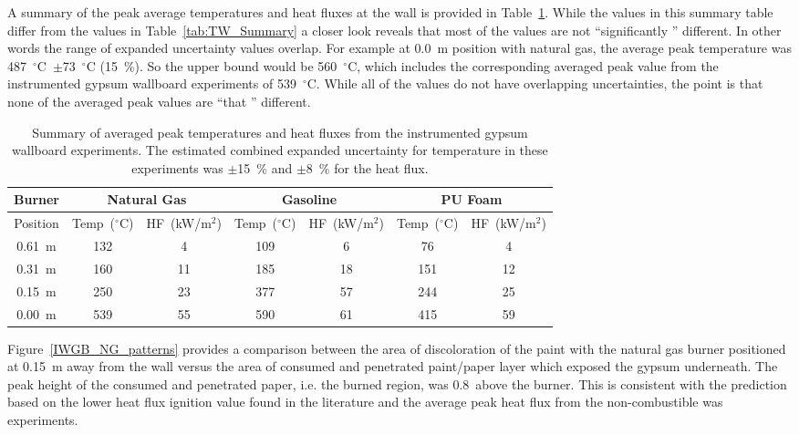 \documentclass[twoside]{uocthesis}
\begin{document}
A summary of the peak average temperatures and heat fluxes at the wall is provided in Table~\ref{tab:IWGB_Summary}. While the values in this summary table differ from the values in Table~\ref{tab:TW_Summary} a closer look reveals that most of the values are not ``significantly '' different.  In other words the range of expanded uncertainty values overlap.  For example at 0.0~m position with natural gas, the average peak temperature was 487~$^\circ$C~$\pm$73~$^\circ$C (15~\%). So the upper bound would be 560~$^\circ$C, which includes the corresponding averaged peak value from the instrumented gypsum wallboard experiments of 539~$^\circ$C.  While all of the values do not have overlapping uncertainties, the point is that none of the averaged peak values are ``that '' different.        

\begin{table}
	\centering
	\scriptsize
	\begin{tabular}{|c|c|c|c|c|c|c|}
		\hline {Burner} & \multicolumn{2}{c}{Natural Gas} & \multicolumn{2}{c}{Gasoline} & \multicolumn{2}{c|}{PU Foam} \\
		\hline  Position & Temp~($^\circ$C) & HF~(kW/m$^{2}$) & Temp~($^\circ$C) & HF~(kW/m$^{2}$) & Temp~($^\circ$C) & HF~(kW/m$^{2}$) 	\\
		\hline \hline 0.61~m & 132 & 4 & 109 & 6 & 76 & 4 \\
		\hline 0.31~m & 160 & 11 & 185 & 18 & 151 & 12	\\
		\hline 0.15~m & 250 & 23 & 377 & 57 & 244 & 25	\\
		\hline 0.00~m & 539 & 55 & 590 & 61 & 415 & 59 	\\
		\hline
	\end{tabular}
	\caption[Summary of instrumented gypsum wallboard experiments]{Summary of averaged peak temperatures and heat fluxes from the instrumented gypsum wallboard experiments.  The estimated combined expanded uncertainty for temperature in these experiments was $\pm$15~\% and $\pm$8~\% for the heat flux.} 
	\label{tab:IWGB_Summary}
\end{table}

Figure~\ref{IWGB_NG_patterns} provides a comparison between the area of discoloration of the paint with the natural gas burner positioned at 0.15~m away from the wall versus the area of consumed and penetrated paint/paper layer which exposed the gypsum underneath.  The peak height of the consumed and penetrated paper, i.e. the burned region, was 0.8~above the burner.  This is consistent with the prediction based on the lower heat flux ignition value found in the literature and the average peak heat flux from the non-combustible was experiments. 
\end{document}
